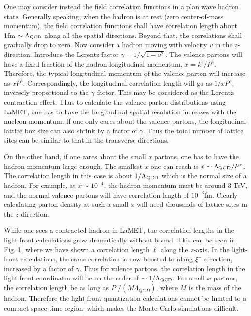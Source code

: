 \documentclass[aps,prd,preprint,tightenlines,superscriptaddress]{revtex4}
\begin{document}
One may consider instead the field correlation functions in a plan wave
hadron state. Generally speaking, when the hadron is at rest (zero center-of-mass momentum),
the field correlation functions shall have correlation length about 1fm $\sim \Lambda_{\rm QCD}$
along all the spatial directions. Beyond that, the correlations shall gradually drop to zero.
Now consider a hadron moving with velocity $v$ in the $z$-direction. Introduce the Lorentz factor $\gamma=
1/\sqrt{1-v^2}$. The valence partons will have a fixed fraction of the hadron 
longitudinal momentum, $x=k^z/P^z$. Therefore, the typical longitudinal momentum of the valence 
parton will increase as $xP^z$. Correspondingly, the longitudinal correlation length will go as
$1/xP^z$, inversely proportional to the $\gamma$ factor. This may be considered as the Lorentz 
contraction effect. Thus to calculate the valence parton distributions using LaMET, one has to 
have the longitudinal spatial resolution increases with the nucleon momentum. If one only cares 
about the valence partons, the longitudinal lattice box size can also shrink by a factor of 
$\gamma$. Thus the total number of lattice sites can be similar to that in the transverse directions.

On the other hand, if one cares about the small $x$ partons, one has to have the hadron momentum 
large enough. The smallest $x$ one can reach is $x\sim \Lambda_{\rm QCD}/P^z$. The correlation length
in this case is about $ 1/\Lambda_{\rm QCD}$ which is the normal size of a hadron. For example, at $
x\sim 10^{-4}$, the hadron momentum must be around 3 TeV, and the normal valence partons will have 
correlation length of $10^{-3}$fm. Clearly calculating parton density at such a small $x$ will need
thousands of lattice sites in the $z$-direction.

While one sees a contracted hadron in LaMET, the correlation lengths in the light-front calculations
grow dramatically without bound. This can be seen in Fig. 1, where we have shown a correlation length
$\ell$ along the $z$-axis. In the light-front calculations, the same correlation is now boosted
to along $\xi^-$ direction, increased by a factor of $\gamma$. Thus for valence partons, the correlation length
in the light-front coordinates will be on the order of $\sim 1/\Lambda_{\rm QCD}$. 
For small $x$-partons, the correlation length be as long as $P^z/(M\Lambda_{QCD})$, where $M$ is the mass of
the hadron. Therefore the light-front quantization calculations cannot be limited to a compact space-time 
region, which makes the Monte Carlo simulations difficult.
\end{document}
